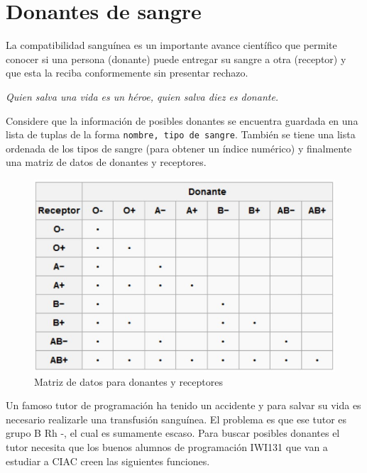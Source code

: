 \section{Donantes de sangre}

La compatibilidad sanguínea es un importante avance científico que permite conocer si una persona (donante) puede entregar su sangre a otra (receptor) y que esta la reciba conformemente sin presentar rechazo.

\begin{center}
    \textit{Quien salva una vida es un héroe, quien salva diez es donante.}
\end{center}

Considere que la información de posibles donantes se encuentra guardada en una lista de tuplas de la forma \texttt{nombre, tipo de sangre}. También se tiene una lista ordenada de los tipos de sangre (para obtener un índice numérico) y finalmente una matriz de datos de donantes y receptores.

\begin{figure}[H]
    \centering
    \includegraphics[scale=0.6]{Guia/sangre.jpg}
    \caption{Matriz de datos para donantes y receptores}
\end{figure}

Un famoso tutor de programación ha tenido un accidente y para salvar su vida es necesario realizarle una transfusión sanguínea. El problema es que ese tutor es grupo B Rh -, el cual es sumamente escaso. Para buscar posibles donantes el tutor necesita que los buenos alumnos de programación IWI131 que van a estudiar a CIAC creen las siguientes funciones.

